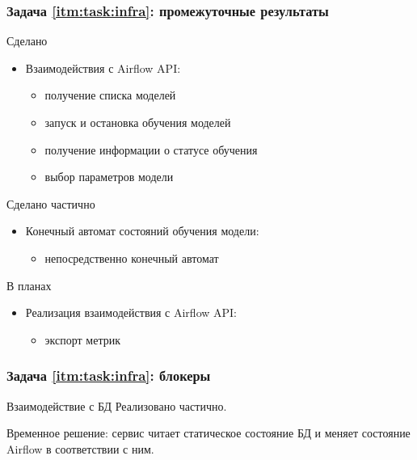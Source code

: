 \begin{frame}
\frametitle{Задача \ref{itm:task:infra}: промежуточные результаты}
\begin{block}{Сделано}
	\begin{itemize}
		\item Взаимодействия с Airflow API:
		\begin{itemize}
			\item получение списка моделей
			\item запуск и остановка обучения моделей
			\item получение информации о статусе обучения
			\item выбор параметров модели
		\end{itemize}
	\end{itemize}
\end{block}

\begin{block}{Сделано частично}
	\begin{itemize}
		\item Конечный автомат состояний обучения модели:
		\begin{itemize}
			\item непосредственно конечный автомат
		\end{itemize}
	\end{itemize}
\end{block}

\begin{block}{В планах}
	\begin{itemize}
		\item Реализация взаимодействия с Airflow API:
		\begin{itemize}
			\item экспорт метрик
		\end{itemize}
	\end{itemize}
\end{block}
\end{frame}

\begin{frame}
\frametitle{Задача \ref{itm:task:infra}: блокеры}
\begin{block}{Взаимодействие с БД}
	Реализовано частично.

	Временное решение: сервис читает статическое
	состояние БД и меняет состояние Airflow в соответствии с ним.
\end{block}
\end{frame}